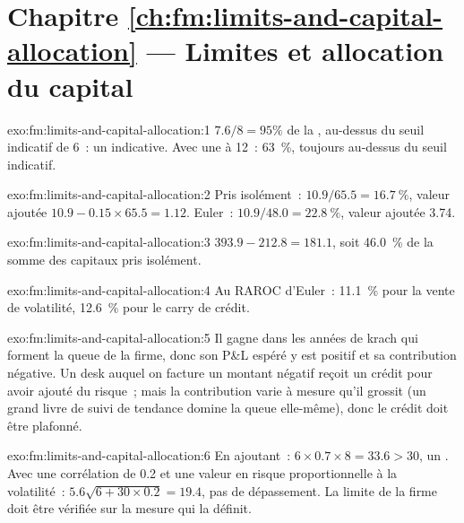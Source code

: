 \section*{Chapitre \ref{ch:fm:limits-and-capital-allocation} --- Limites et allocation du capital}

\begin{solution}{exo:fm:limits-and-capital-allocation:1}
$7.6/8=95\%$ de la , au-dessus du seuil indicatif de 6~: un  indicative. Avec une  à 12~: 63~\%, toujours au-dessus du seuil indicatif.
\end{solution}

\begin{solution}{exo:fm:limits-and-capital-allocation:2}
Pris isolément~: $10.9/65.5=16.7~\%$, valeur ajoutée $10.9-0.15\times65.5=1.12$. Euler~: $10.9/48.0=22.8~\%$, valeur ajoutée 3.74.
\end{solution}

\begin{solution}{exo:fm:limits-and-capital-allocation:3}
$393.9-212.8=181.1$, soit 46.0~\% de la somme des capitaux pris isolément.
\end{solution}

\begin{solution}{exo:fm:limits-and-capital-allocation:4}
Au RAROC d'Euler~: 11.1~\% pour la vente de volatilité, 12.6~\% pour le carry de crédit.
\end{solution}

\begin{solution}{exo:fm:limits-and-capital-allocation:5}
Il gagne dans les années de krach qui forment la queue de la firme, donc son P\&L espéré y est positif et sa contribution négative. Un desk auquel on facture un
montant négatif reçoit un crédit pour avoir ajouté du risque~; mais la contribution varie à mesure qu'il grossit (un grand livre de suivi de tendance domine la queue elle-même), donc le
crédit doit être plafonné.
\end{solution}

\begin{solution}{exo:fm:limits-and-capital-allocation:6}
En ajoutant~: $6\times0.7\times8=33.6>30$, un . Avec une corrélation de 0.2 et une valeur en risque proportionnelle à la volatilité~: $5.6\sqrt{6+30\times0.2}=19.4$, pas de dépassement.
La limite de la firme doit être vérifiée sur la mesure qui la définit.
\end{solution}

